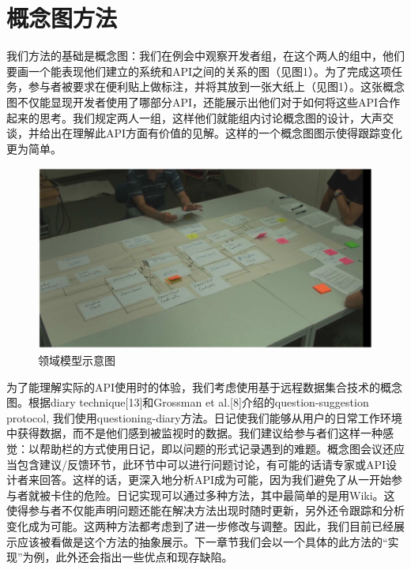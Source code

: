 \section*{概念图方法}
我们方法的基础是概念图：我们在例会中观察开发者组，在这个两人的组中，他们要画一个能表现他们建立的系统和API之间的关系的图（见图1）。为了完成这项任务，参与者被要求在便利贴上做标注，并将其放到一张大纸上（见图1）。这张概念图不仅能显现开发者使用了哪部分API，还能展示出他们对于如何将这些API合作起来的思考。我们规定两人一组，这样他们就能组内讨论概念图的设计，大声交谈，并给出在理解此API方面有价值的见解。这样的一个概念图图示使得跟踪变化更为简单。
\begin{figure}[!hbp]
  \begin{center}
    \includegraphics[scale=0.3]{figures/translation/translation_api_fig1.png}\\
    领域模型示意图
  \end{center}
\end{figure}

为了能理解实际的API使用时的体验，我们考虑使用基于远程数据集合技术的概念图。根据diary technique[13]和Grossman et al.[8]介绍的question-suggestion protocol, 我们使用questioning-diary方法。日记使我们能够从用户的日常工作环境中获得数据，而不是他们感到被监视时的数据。我们建议给参与者们这样一种感觉：以帮助栏的方式使用日记，即以问题的形式记录遇到的难题。概念图会议还应当包含建议/反馈环节，此环节中可以进行问题讨论，有可能的话请专家或API设计者来回答。这样的话，更深入地分析API成为可能，因为我们避免了从一开始参与者就被卡住的危险。日记实现可以通过多种方法，其中最简单的是用Wiki。这使得参与者不仅能声明问题还能在解决方法出现时随时更新，另外还令跟踪和分析变化成为可能。这两种方法都考虑到了进一步修改与调整。因此，我们目前已经展示应该被看做是这个方法的抽象展示。下一章节我们会以一个具体的此方法的“实现”为例，此外还会指出一些优点和现存缺陷。
